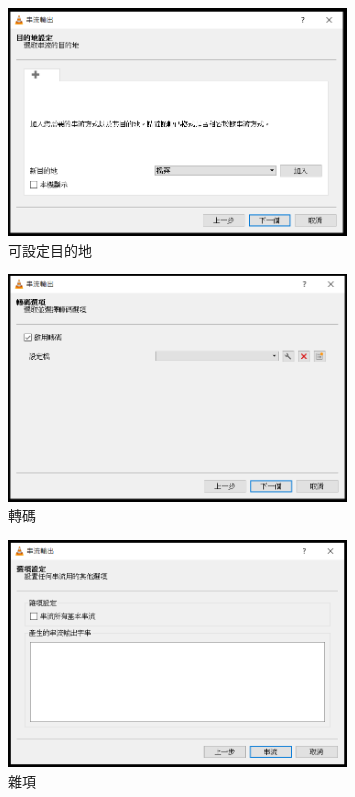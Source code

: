 \documentclass[10pt,UTF8]{ctexart}
\begin{document}
\begin{figure}[H]
\centering 
\includegraphics[width=0.80\textwidth]{10.png} 
\caption{可設定目的地}
\label{Test}
\end{figure}

\begin{figure}[H]
\centering 
\includegraphics[width=0.80\textwidth]{11.png} 
\caption{轉碼}
\label{Test}
\end{figure}

\begin{figure}[H]
\centering 
\includegraphics[width=0.80\textwidth]{12.png} 
\caption{雜項}
\label{Test}
\end{figure}
\end{document}
